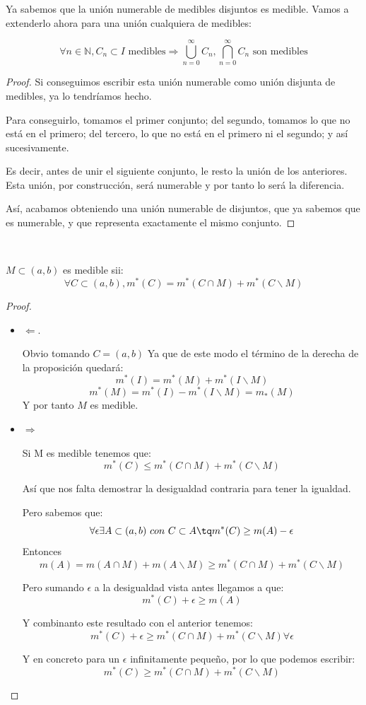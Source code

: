 \documentclass{apuntes}
\begin{document}
Ya sabemos que la unión numerable de medibles disjuntos es medible. Vamos a extenderlo ahora para una unión cualquiera de medibles:

\begin{prop}
\[ \forall n \in \mathbb{N}, C_n \subset I \text{  medibles} \Rightarrow \bigcup_{n=0}^{\infty} C_n, \bigcap_{n=0}^{\infty} C_n  \text{ son medibles} \]
\end{prop}
\begin{proof}
Si conseguimos escribir esta unión numerable como unión disjunta de medibles, ya lo tendríamos hecho.

Para conseguirlo, tomamos el primer conjunto; del segundo, tomamos lo que no está en el primero; del tercero, lo que no está en el primero ni el segundo; y así sucesivamente.

Es decir, antes de unir el siguiente conjunto, le resto la unión de los anteriores. Esta unión, por construcción, será numerable y por tanto lo será la diferencia.

Así, acabamos obteniendo una unión numerable de disjuntos, que ya sabemos que es numerable, y que representa exactamente el mismo conjunto.
\end{proof}

\begin{prop}[Caratheodory] $ $ %

$M \subset (a,b)$  es medible sii:
\[ \forall C \subset (a,b), m^*(C)=m^*(C\cap M)+m^*(C \smallsetminus M) \]
\end{prop}
\begin{proof}
\begin{itemize}
\item $\Leftarrow$.

Obvio tomando $C=(a,b)$
Ya que de este modo el término de la derecha de la proposición quedará:
\[m^*(I) = m^*(M) + m^*(I \smallsetminus M)\]
\[m^*(M) = m^*(I) - m^*(I \smallsetminus M) = m_*(M)\]
Y por tanto $M$ es medible.

\item $\Rightarrow$

Si M es medible tenemos que:
\[m^*(C) \leq m^*(C\cap M)+m^*(C \smallsetminus M)\]

Así que nos falta demostrar la desigualdad contraria para tener la igualdad.

Pero sabemos que:
\[\forall \epsilon \exists A \subset (a,b) \ con \ C \subset A \tq m^*(C) \geq m(A)-\epsilon\]
Entonces
\[m(A)=m(A\cap M) + m (A \smallsetminus M) \geq m^*(C \cap M) + m^*(C\smallsetminus M)\]

Pero sumando $\epsilon$ a la desigualdad vista antes llegamos a que:
\[m^*(C) + \epsilon \geq m(A)\]

Y combinanto este resultado con el anterior tenemos:
\[m^*(C) + \epsilon \geq m^*(C \cap M) + m^*(C\smallsetminus M) \forall \epsilon\]

Y en concreto para un $\epsilon$ infinitamente pequeño, por lo que podemos escribir:
\[m^*(C) \geq m^*(C \cap M) + m^*(C\smallsetminus M)\]

\end{itemize}
\end{proof}
\end{document}
